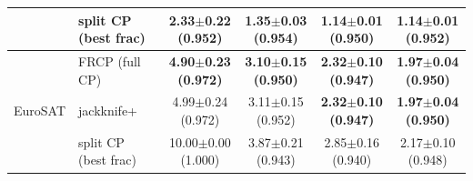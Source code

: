 \begin{table}[t]
\begin{tabular}{llcccc}
 & split CP (best frac) & 2.33$\pm$0.22 {\scriptsize(0.952)} & 1.35$\pm$0.03 {\scriptsize(0.954)} & \textbf{1.14$\pm$0.01 {\scriptsize(0.950)}} & 1.14$\pm$0.01 {\scriptsize(0.952)}\\
\midrule
\multirow{3}{*}{EuroSAT} & FRCP (full CP) & \textbf{4.90$\pm$0.23 {\scriptsize(0.972)}} & \textbf{3.10$\pm$0.15 {\scriptsize(0.950)}} & \textbf{2.32$\pm$0.10 {\scriptsize(0.947)}} & \textbf{1.97$\pm$0.04 {\scriptsize(0.950)}}\\
 & jackknife+ & 4.99$\pm$0.24 {\scriptsize(0.972)} & 3.11$\pm$0.15 {\scriptsize(0.952)} & \textbf{2.32$\pm$0.10 {\scriptsize(0.947)}} & \textbf{1.97$\pm$0.04 {\scriptsize(0.950)}}\\
 & split CP (best frac) & 10.00$\pm$0.00 {\scriptsize(1.000)} & 3.87$\pm$0.21 {\scriptsize(0.943)} & 2.85$\pm$0.16 {\scriptsize(0.940)} & 2.17$\pm$0.10 {\scriptsize(0.948)}\\
\bottomrule
\end{tabular}
\end{table}
